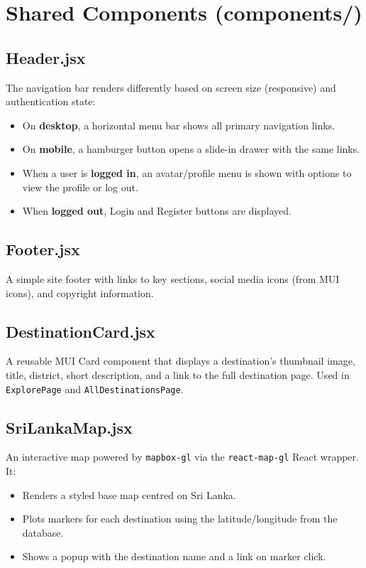\documentclass[12pt,a4paper]{report}
\begin{document}
\section{Shared Components (components/)}

\subsection{Header.jsx}

The navigation bar renders differently based on screen size (responsive) and authentication state:

\begin{itemize}[leftmargin=2em]
  \item On \textbf{desktop}, a horizontal menu bar shows all primary navigation links.
  \item On \textbf{mobile}, a hamburger button opens a slide-in drawer with the same links.
  \item When a user is \textbf{logged in}, an avatar/profile menu is shown with options to view the profile or log out.
  \item When \textbf{logged out}, Login and Register buttons are displayed.
\end{itemize}

\subsection{Footer.jsx}

A simple site footer with links to key sections, social media icons (from MUI icons), and copyright information.

\subsection{DestinationCard.jsx}

A reusable MUI Card component that displays a destination's thumbnail image, title, district, short description, and a link to the full destination page. Used in \texttt{ExplorePage} and \texttt{AllDestinationsPage}.

\subsection{SriLankaMap.jsx}

An interactive map powered by \texttt{mapbox-gl} via the \texttt{react-map-gl} React wrapper. It:
\begin{itemize}[leftmargin=2em]
  \item Renders a styled base map centred on Sri Lanka.
  \item Plots markers for each destination using the latitude/longitude from the database.
  \item Shows a popup with the destination name and a link on marker click.
\end{itemize}
\end{document}

